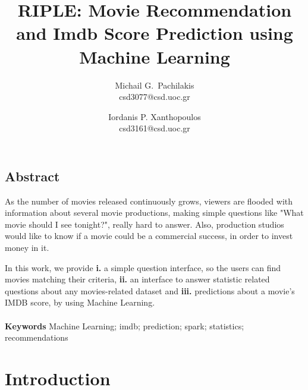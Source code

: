 \documentclass[letterpaper,twocolumn,10pt]{article}
\begin{document}
\date{}

\title{\Large \bf RIPLE: Movie Recommendation and Imdb Score Prediction using Machine Learning}

\author{
{\rm Michail G.\ Pachilakis}\\
csd3077@csd.uoc.gr
\and
{\rm Iordanis P. Xanthopoulos}\\
csd3161@csd.uoc.gr
} %

\maketitle

\thispagestyle{empty}


\subsection*{Abstract}
\par As the number of movies released continuously grows, viewers are flooded with information about several movie productions, making simple questions like "What movie should I see tonight?", really hard to answer. Also, production studios would like to know if a movie could be a commercial success, in order to invest money in it.\par In this work, we provide  \textbf{i.} a simple question interface, so the users can find movies matching their criteria, \textbf{ii.} an interface to answer statistic related questions about any movies-related dataset and \textbf{iii.} predictions about a movie's IMDB score, by using Machine Learning.\\
\\
\textbf{Keywords} Machine Learning; imdb; prediction; spark; statistics; recommendations


\section{Introduction}
\end{document}
